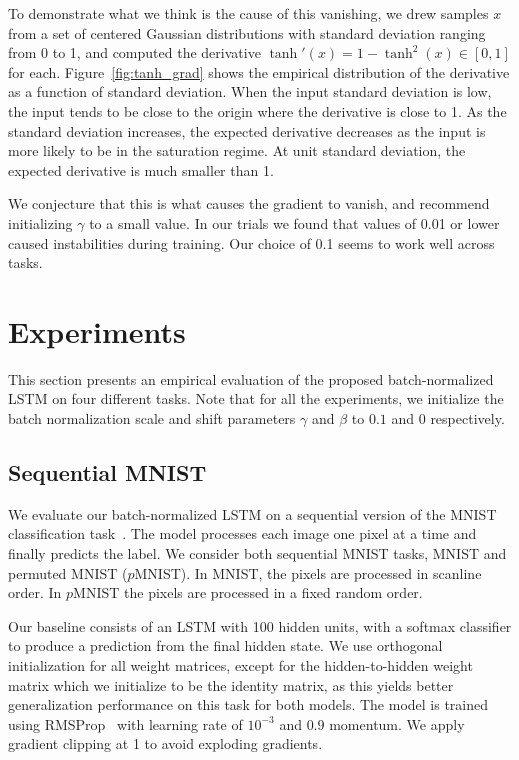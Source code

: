 \documentclass{article} %
\begin{document}
To demonstrate what we think is the cause of this vanishing, we drew samples $x$ from a set of centered Gaussian distributions with standard deviation ranging from 0 to 1, and computed the derivative $\tanh'(x) = 1 - \tanh^2(x) \in [0, 1]$ for each.
Figure~\ref{fig:tanh_grad} shows the empirical distribution of the derivative as a function of standard deviation.
When the input standard deviation is low, the input tends to be close to the origin where the derivative is close to 1.
As the standard deviation increases, the expected derivative decreases as the input is more likely to be in the saturation regime.
At unit standard deviation, the expected derivative is much smaller than 1.

We conjecture that this is what causes the gradient to vanish, and recommend initializing $\gamma$ to a small value.
In our trials we found that values of 0.01 or lower caused instabilities during training.
Our choice of 0.1 seems to work well across tasks.

\section{Experiments}
\label{sec:experiments}

This section presents an empirical evaluation of the proposed batch-normalized LSTM on four different tasks.
Note that for all the experiments, we initialize the batch normalization scale and shift parameters $\gamma$ and $\beta$ to $0.1$ and $0$ respectively.

\subsection{Sequential MNIST}
\label{sec:seqmnist}

We evaluate our batch-normalized LSTM on a sequential version of the MNIST classification task~\cite{le2015simple}.
The model processes each image one pixel at a time and finally predicts the label.
We consider both sequential MNIST tasks, MNIST and permuted MNIST ($p$MNIST).
In MNIST, the pixels are processed in scanline order.
In $p$MNIST the pixels are processed in a fixed random order.

Our baseline consists of an LSTM with 100 hidden units, with a softmax classifier to produce a prediction from the final hidden state.
We use orthogonal initialization for all weight matrices, except for the hidden-to-hidden weight matrix which we initialize to be the identity matrix,
as this yields better generalization performance on this task for both models.
The model is trained using RMSProp~\cite{rmsprop} with learning rate of $10^{-3}$ and $0.9$ momentum.
We apply gradient clipping at 1 to avoid exploding gradients.
\end{document}
